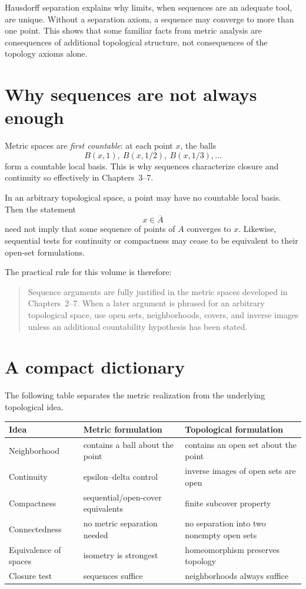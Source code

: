 Hausdorff separation explains why limits, when sequences are an adequate tool, are unique. Without a separation axiom, a sequence may converge to more than one point. This shows that some familiar facts from metric analysis are consequences of additional topological structure, not consequences of the topology axioms alone.

\section{Why sequences are not always enough}
Metric spaces are \emph{first countable}: at each point \(x\), the balls
\[
B(x,1),\ B(x,1/2),\ B(x,1/3),\dots
\]
form a countable local basis. This is why sequences characterize closure and continuity so effectively in Chapters~3--7.

In an arbitrary topological space, a point may have no countable local basis. Then the statement
\[
x\in\overline A
\]
need not imply that some sequence of points of \(A\) converges to \(x\). Likewise, sequential tests for continuity or compactness may cease to be equivalent to their open-set formulations.

The practical rule for this volume is therefore:
\begin{quote}
Sequence arguments are fully justified in the metric spaces developed in Chapters~2--7. When a later argument is phrased for an arbitrary topological space, use open sets, neighborhoods, covers, and inverse images unless an additional countability hypothesis has been stated.
\end{quote}

\section{A compact dictionary}
The following table separates the metric realization from the underlying topological idea.

\begin{center}
\begin{tabular}{p{}p{}p{}}
\textbf{Idea} & \textbf{Metric formulation} & \textbf{Topological formulation}\\\hline
Neighborhood & contains a ball about the point & contains an open set about the point\\
Continuity & epsilon--delta control & inverse images of open sets are open\\
Compactness & sequential/open-cover equivalents & finite subcover property\\
Connectedness & no metric separation needed & no separation into two nonempty open sets\\
Equivalence of spaces & isometry is strongest & homeomorphism preserves topology\\
Closure test & sequences suffice & neighborhoods always suffice\\
\end{tabular}
\end{center}

